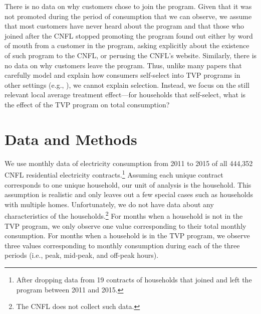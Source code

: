 \documentclass[12pt]{article}
\begin{document}
There is no data on why customers chose to join the program. Given that it was not promoted during the period of consumption that we can observe, we assume that most customers have never heard about the program and that those who joined after the CNFL stopped promoting the program found out either by word of mouth from a customer in the program, asking explicitly about the existence of such program to the CNFL, or perusing the CNFL’s website. Similarly, there is no data on why customers leave the program. Thus, unlike many papers that carefully model and explain how consumers self-select into TVP programs in other settings (e.g., \cite{itoSelectionWelfareGains2021}), we cannot explain selection. Instead, we focus on the still relevant local average treatment effect---for households that self-select, what is the effect of the TVP program on total consumption?

\section{Data and Methods}

We use monthly data of electricity consumption from 2011 to 2015 of all 444,352 CNFL residential electricity contracts.\footnote{After dropping data from 19 contracts of households that joined and left the program between 2011 and 2015.} Assuming each unique contract corresponds to one unique household, our unit of analysis is the household. This assumption is realistic and only leaves out a few special cases such as households with multiple homes. Unfortunately, we do not have data about any characteristics of the households.\footnote{The CNFL does not collect such data.} For months when a household is not in the TVP program, we only observe one value corresponding to their total monthly consumption. For months when a household is in the TVP program, we observe three values corresponding to monthly consumption during each of the three periods (i.e., peak, mid-peak, and off-peak hours).
\end{document}
